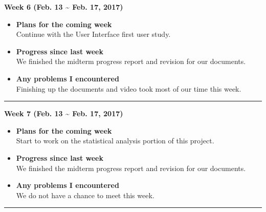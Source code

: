 	\begin{center}
		\textbf{Week 6 (Feb. 13 {\textasciitilde{}} Feb. 17, 2017)}
	\end{center}
	\begin{itemize}
		\item \textbf{Plans for the coming week}
		\\Continue with the User Interface first user study. \\

		\item \textbf{Progress since last week}
		\\We finished the midterm progress report and revision for our documents. \\

		\item \textbf{Any problems I encountered}
		\\Finishing up the documents and video took most of our time this week.\\
	\end{itemize}

	\rule{\textwidth}{0.5pt}

	\begin{center}
		\textbf{Week 7 (Feb. 13 {\textasciitilde{}} Feb. 17, 2017)}
	\end{center}
	\begin{itemize}
		\item \textbf{Plans for the coming week}
		\\Start to work on the statistical analysis portion of this project. \\

		\item \textbf{Progress since last week}
		\\We finished the midterm progress report and revision for our documents. \\

		\item \textbf{Any problems I encountered}
		\\We do not have a chance to meet this week.\\
	\end{itemize}

	\rule{\textwidth}{0.5pt}

